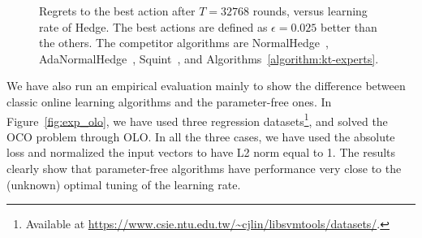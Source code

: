\begin{figure}[t]
\begin{center}
\caption{\footnotesize{Regrets to the best action after $T = 32768$ rounds, versus learning rate of Hedge. The best actions are defined as $\epsilon=0.025$ better than the others. The competitor algorithms are NormalHedge~\cite{Chaudhuri-Freund-Hsu-2009}, AdaNormalHedge~\cite{Luo-Schapire-2015}, Squint~\cite{Koolen-van-Erven-2015}, and Algorithms~\ref{algorithm:kt-experts}.}}
\label{fig:exp_lea}
\end{center}
\end{figure}


We have also run an empirical evaluation mainly to show the difference between classic online learning algorithms and the parameter-free ones. In Figure~\ref{fig:exp_olo}, we have used three regression datasets\footnote{Available at \url{https://www.csie.ntu.edu.tw/~cjlin/libsvmtools/datasets/}.}, and solved the \ac{OCO} problem through \ac{OLO}. In all the three cases, we have used the absolute loss and normalized the input vectors to have L2 norm equal to 1. The results clearly show that parameter-free algorithms have performance very close to the (unknown) optimal tuning of the learning rate.

